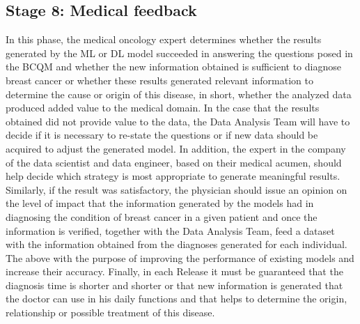 \subsection*{Stage 8: Medical feedback}
In this phase, the medical oncology expert determines whether the results generated by the ML or DL model succeeded in answering the questions posed in the BCQM and whether the new information obtained is sufficient to diagnose breast cancer or whether these results generated relevant information to determine the cause or origin of this disease, in short, whether the analyzed data produced added value to the medical domain. In the case that the results obtained did not provide value to the data, the Data Analysis Team will have to decide if it is necessary to re-state the questions or if new data should be acquired to adjust the generated model. In addition, the expert in the company of the data scientist and data engineer, based on their medical acumen, should help decide which strategy is most appropriate to generate meaningful results. Similarly, if the result was satisfactory, the physician should issue an opinion on the level of impact that the information generated by the models had in diagnosing the condition of breast cancer in a given patient and once the information is verified, together with the Data Analysis Team, feed a dataset with the information obtained from the diagnoses generated for each individual. The above with the purpose of improving the performance of existing models and increase their accuracy. Finally, in each Release it must be guaranteed that the diagnosis time is shorter and shorter or that new information is generated that the doctor can use in his daily functions and that helps to determine the origin, relationship or possible treatment of this disease.

